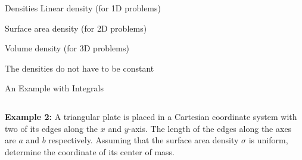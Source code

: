 \documentclass[12pt,compress,aspectratio=169]{beamer}
\begin{document}
\begin{frame}{Densities}
  Linear density (for 1D problems)


  Surface area density (for 2D problems)


  Volume density (for 3D problems)

  
  The densities do not have to be constant
\end{frame}


\begin{frame}{An Example with Integrals}
  \begin{columns}
    \textbf{Example 2:} A triangular plate is placed in a Cartesian coordinate
    system with two of its edges along the $x$ and $y$-axis. The length of the
    edges along the axes are $a$ and $b$ respectively. Assuming that the
    surface area density $\sigma$ is uniform, determine the coordinate of its
    center of mass.

  \end{columns}
\end{frame}
\end{document}
